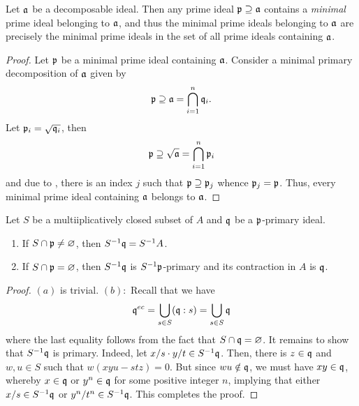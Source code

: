 \begin{proposition}
    Let $\mathfrak a$ be a decomposable ideal. Then any prime ideal $\mathfrak p\supseteq\mathfrak a$ contains a \textit{minimal} prime ideal belonging to $\mathfrak a$, and thus the minimal prime ideals belonging to $\mathfrak a$ are precisely the minimal prime ideals in the set of all prime ideals containing $\mathfrak a$.
\end{proposition}
\begin{proof}
    Let $\mathfrak p$ be a minimal prime ideal containing $\mathfrak a$. Consider a minimal primary decomposition of $\mathfrak a$ given by 
    \begin{equation*}
        \mathfrak p\supseteq\mathfrak a = \bigcap_{i = 1}^n\mathfrak q_i.
    \end{equation*}
    Let $\mathfrak p_i = \sqrt{\mathfrak q_i}$, then 
    \begin{equation*}
        \mathfrak p\supseteq\sqrt{\mathfrak a} = \bigcap_{i = 1}^n\mathfrak p_i
    \end{equation*}
    and due to , there is an index $j$ such that $\mathfrak p\supseteq\mathfrak p_j$ whence $\mathfrak p_j = \mathfrak p$. Thus, every minimal prime ideal containing $\mathfrak a$ belongs to $\mathfrak a$.
\end{proof}

\begin{proposition}
    Let $S$ be a multiiplicatively closed subset of $A$ and $\mathfrak q$ be a $\mathfrak p$-primary ideal. 
    \begin{enumerate}[label=(\alph*)]
        \item If $S\cap\mathfrak p\ne\varnothing$, then $S^{-1}\mathfrak q = S^{-1}A$. 
        \item If $S\cap\mathfrak p = \varnothing$, then $S^{-1}\mathfrak q$ is $S^{-1}\mathfrak p$-primary and its contraction in $A$ is $\mathfrak q$.
    \end{enumerate}
\end{proposition}
\begin{proof}
    $(a)$ is trivial. $(b):$ Recall that we have 
    \begin{equation*}
        \mathfrak q^{ec} = \bigcup_{s\in S}(\mathfrak q: s) = \bigcup_{s\in S}\mathfrak q
    \end{equation*}
    where the last equality follows from the fact that $S\cap\mathfrak q = \varnothing$. It remains to show that $S^{-1}\mathfrak q$ is primary. Indeed, let $x/s\cdot y/t\in S^{-1}\mathfrak q$. Then, there is $z\in\mathfrak q$ and $w,u\in S$ such that $w(xyu - stz) = 0$. But since $wu\notin\mathfrak q$, we must have $xy\in\mathfrak q$, whereby $x\in\mathfrak q$ or $y^n\in\mathfrak q$ for some positive integer $n$, implying that either $x/s\in S^{-1}\mathfrak q$ or $y^n/t^n\in S^{-1}\mathfrak q$. This completes the proof.
\end{proof}

